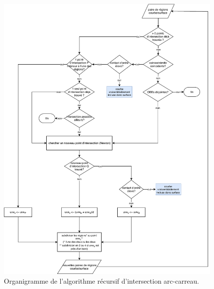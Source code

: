 \begin{figure}
	\centering
	\includegraphics[scale=0.7]{algorithmes/mindmap-intersect_curve_surface.pdf}
	\caption{Organigramme de l'algorithme récursif d'intersection arc-carreau.}
	\label{flowchart:intersect_curve_surface}
\end{figure}